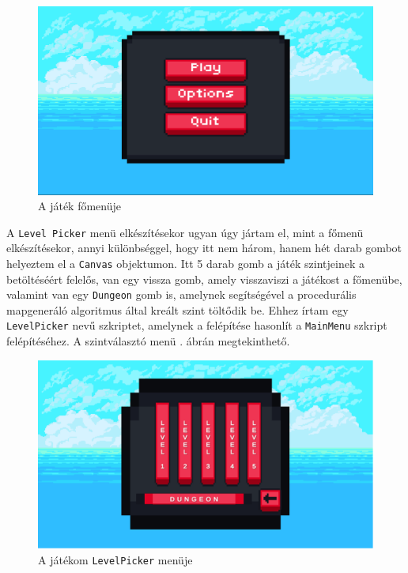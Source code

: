 \begin{figure}[ht]
\centering
\includegraphics[scale = 0.4]{images/mainmenu.png}
\caption{A játék főmenüje}
\label{fig:mainmenu}
\end{figure}


A \texttt{Level Picker} menü elkészítésekor ugyan úgy jártam el, mint a főmenü elkészítésekor, annyi különbséggel, hogy itt nem három, hanem hét darab gombot helyeztem el a \texttt{Canvas} objektumon. Itt 5 darab gomb a játék szintjeinek a betöltéséért felelős, van egy vissza gomb, amely visszaviszi a játékost a főmenübe, valamint van egy \texttt{Dungeon} gomb is, amelynek segítségével a procedurális mapgeneráló algoritmus által kreált szint töltődik be. Ehhez írtam egy \texttt{LevelPicker} nevű szkriptet, amelynek a felépítése hasonlít a \texttt{MainMenu} szkript felépítéséhez. A szintválasztó menü . ábrán megtekinthető.

\begin{figure}[ht]
\centering
\includegraphics[scale = 0.4]{images/levelpicker.png}
\caption{A játékom \texttt{LevelPicker} menüje}
\label{fig:levelpicker}
\end{figure}

